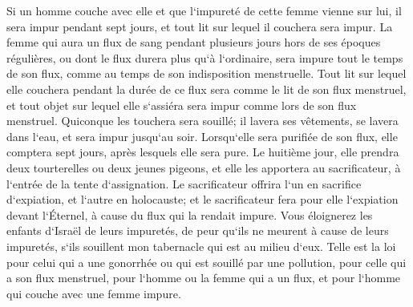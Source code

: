 \verse Si un homme couche avec elle et que l`impureté de cette femme vienne sur lui, il sera impur pendant sept jours, et tout lit sur lequel il couchera sera impur. 
\verse La femme qui aura un flux de sang pendant plusieurs jours hors de ses époques régulières, ou dont le flux durera plus qu`à l`ordinaire, sera impure tout le temps de son flux, comme au temps de son indisposition menstruelle. 
\verse Tout lit sur lequel elle couchera pendant la durée de ce flux sera comme le lit de son flux menstruel, et tout objet sur lequel elle s`assiéra sera impur comme lors de son flux menstruel. 
\verse Quiconque les touchera sera souillé; il lavera ses vêtements, se lavera dans l`eau, et sera impur jusqu`au soir. 
\verse Lorsqu`elle sera purifiée de son flux, elle comptera sept jours, après lesquels elle sera pure. 
\verse Le huitième jour, elle prendra deux tourterelles ou deux jeunes pigeons, et elle les apportera au sacrificateur, à l`entrée de la tente d`assignation. 
\verse Le sacrificateur offrira l`un en sacrifice d`expiation, et l`autre en holocauste; et le sacrificateur fera pour elle l`expiation devant l`Éternel, à cause du flux qui la rendait impure. 
\verse Vous éloignerez les enfants d`Israël de leurs impuretés, de peur qu`ils ne meurent à cause de leurs impuretés, s`ils souillent mon tabernacle qui est au milieu d`eux. 
\verse Telle est la loi pour celui qui a une gonorrhée ou qui est souillé par une pollution, 
\verse pour celle qui a son flux menstruel, pour l`homme ou la femme qui a un flux, et pour l`homme qui couche avec une femme impure. 

\chapter{}

